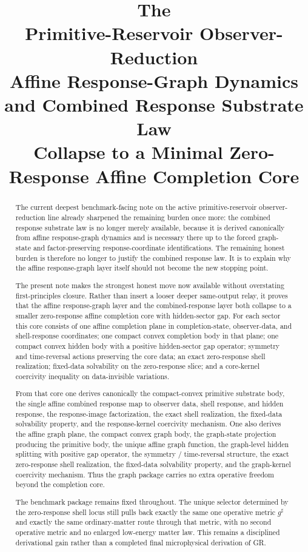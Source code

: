 \documentclass[11pt]{article}
\title{\textbf{The \TheoryName{}}\\[0.4em]
\large Primitive-Reservoir Observer-Reduction\\
\large Affine Response-Graph Dynamics and Combined Response Substrate Law\\
\large Collapse to a Minimal Zero-Response Affine Completion Core}
\author{}
\date{}
\newcommand{\CompletedMetric}{g^{\sharp}}
\begin{document}
\maketitle

\begin{abstract}
The current deepest benchmark-facing note on the active primitive-reservoir observer-reduction line already sharpened the remaining burden once more: the combined response substrate law is no longer merely available, because it is derived canonically from affine response-graph dynamics and is necessary there up to the forced graph-state and factor-preserving response-coordinate identifications. The remaining honest burden is therefore no longer to justify the combined response law. It is to explain why the affine response-graph layer itself should not become the new stopping point.

The present note makes the strongest honest move now available without overstating first-principles closure. Rather than insert a looser deeper same-output relay, it proves that the affine response-graph layer and the combined-response layer both collapse to a smaller zero-response affine completion core with hidden-sector gap. For each sector this core consists of one affine completion plane in completion-state, observer-data, and shell-response coordinates; one compact convex completion body in that plane; one compact convex hidden body with a positive hidden-sector gap operator; symmetry and time-reversal actions preserving the core data; an exact zero-response shell realization; fixed-data solvability on the zero-response slice; and a core-kernel coercivity inequality on data-invisible variations.

From that core one derives canonically the compact-convex primitive substrate body, the single affine combined response map to observer data, shell response, and hidden response, the response-image factorization, the exact shell realization, the fixed-data solvability property, and the response-kernel coercivity mechanism. One also derives the affine graph plane, the compact convex graph body, the graph-state projection producing the primitive body, the unique affine graph function, the graph-level hidden splitting with positive gap operator, the symmetry / time-reversal structure, the exact zero-response shell realization, the fixed-data solvability property, and the graph-kernel coercivity mechanism. Thus the graph package carries no extra operative freedom beyond the completion core.

The benchmark package remains fixed throughout. The unique selector determined by the zero-response shell locus still pulls back exactly the same one operative metric \(\CompletedMetric\) and exactly the same ordinary-matter route through that metric, with no second operative metric and no enlarged low-energy matter law. This remains a disciplined derivational gain rather than a completed final microphysical derivation of GR.
\end{abstract}
\end{document}
